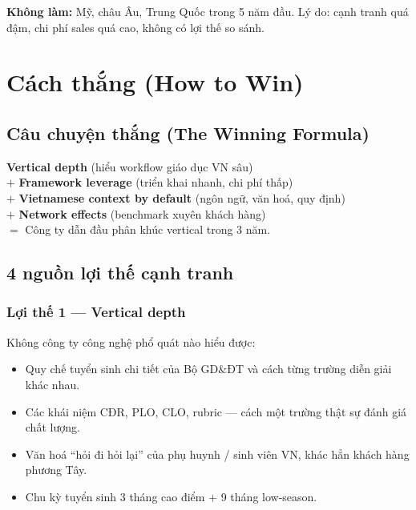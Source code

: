 \documentclass[11pt,a4paper]{article}
\begin{document}
\textbf{Không làm:} Mỹ, châu Âu, Trung Quốc trong 5 năm đầu. Lý do: cạnh tranh
quá đậm, chi phí sales quá cao, không có lợi thế so sánh.

\clearpage

\section{Cách thắng (How to Win)}

\subsection{Câu chuyện thắng (The Winning Formula)}

\begin{keybox}[title=Công thức thắng]
\textbf{Vertical depth} (hiểu workflow giáo dục VN sâu)\\
$+$ \textbf{Framework leverage} (triển khai nhanh, chi phí thấp)\\
$+$ \textbf{Vietnamese context by default} (ngôn ngữ, văn hoá, quy định)\\
$+$ \textbf{Network effects} (benchmark xuyên khách hàng)\\
$=$ Công ty dẫn đầu phân khúc vertical trong 3 năm.
\end{keybox}

\subsection{4 nguồn lợi thế cạnh tranh}

\subsubsection*{Lợi thế 1 --- Vertical depth}

Không công ty công nghệ phổ quát nào hiểu được:
\begin{itemize}
\item Quy chế tuyển sinh chi tiết của Bộ GD\&ĐT và cách từng trường diễn giải khác nhau.
\item Các khái niệm CĐR, PLO, CLO, rubric --- cách một trường thật sự đánh giá chất lượng.
\item Văn hoá ``hỏi đi hỏi lại'' của phụ huynh / sinh viên VN, khác hẳn khách hàng phương Tây.
\item Chu kỳ tuyển sinh 3 tháng cao điểm + 9 tháng low-season.
\end{itemize}
\end{document}
